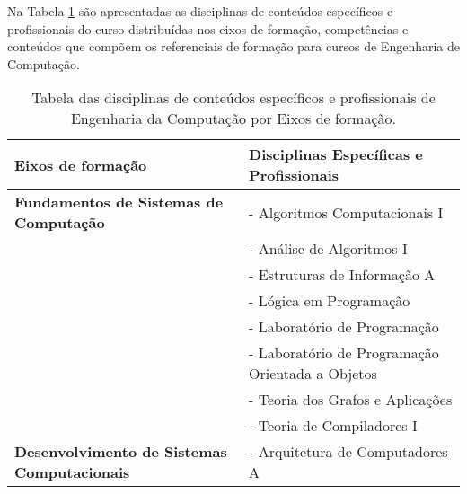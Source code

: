 Na Tabela \ref{tab:eixos} são apresentadas as disciplinas de conteúdos específicos e profissionais do curso distribuídas nos eixos de formação, competências e conteúdos que compõem os referenciais de formação para cursos de Engenharia de Computação.




\begin{table}[ht]

    \centering

    \caption{Tabela das disciplinas de conteúdos específicos e profissionais de Engenharia da Computação por Eixos de formação.}

    \label{tab:eixos}

    \begin{tabular}{l l}

        \hline

        {\bf Eixos de formação} & {\bf Disciplinas Específicas e Profissionais}          \\

        \hline

        \textbf{Fundamentos de Sistemas de Computação}
                                & - Algoritmos Computacionais I                          \\

                                & - Análise de Algoritmos I                              \\

                                & - Estruturas de Informação A                           \\

                                & - Lógica em Programação                                \\

                                & - Laboratório de Programação                           \\

                                & - Laboratório de Programação Orientada a Objetos       \\

                                & - Teoria dos Grafos e Aplicações                       \\

                                & - Teoria de Compiladores I                             \\ \hline

        \textbf{Desenvolvimento de Sistemas Computacionais}
                                & - Arquitetura de Computadores A                        \\


\end{tabular}
\end{table}
